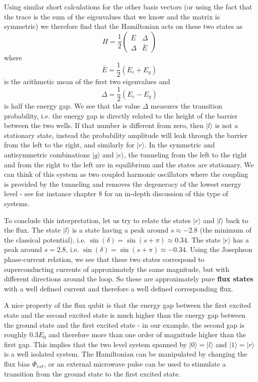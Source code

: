 \documentclass[a4paper, draft]{article}
\theoremstyle{own}
\theoremstyle{remark}
\begin{document}
Using similar short calculations for the other basis vectors (or using the fact that the trace is the sum of the eigenvalues that we know and the matrix is symmetric) we therefore find that the Hamiltonian acts on these two states as
$$
H = \frac{1}{2} 
\begin{pmatrix}
\bar{E} & \Delta \\
\Delta & \bar{E}
\end{pmatrix} 
$$
where
$$
\bar{E} = \frac{1}{2} (E_e + E_g) 
$$
is the arithmetic mean of the first two eigenvalues and 
$$
\Delta = \frac{1}{2} (E_e - E_g)
$$
is half the energy gap. We see that the value $\Delta$ measures the transition probability, i.e. the energy gap is directly related to the height of the barrier between the two wells. If that number is different from zero, then $|l \rangle$ is not a stationary state, instead the probability amplitude will leak through the barrier from the left to the right, and similarly for $|r \rangle$. In the symmetric and antisymmetric combinations $|g \rangle$ and $|e \rangle$, the tunneling from the left to the right and from the right to the left are in equilibrium and the states are stationary. We can think of this system as two coupled harmonic oscillators where the coupling is provided by the tunneling and removes the degeneracy of the lowest energy level - see for instance \cite{FeynmanIII} chapter 8 for an in-depth discussion of this type of systems. 

To conclude this interpretation, let us try to relate the states $|r \rangle$ and $|l \rangle$ back to the flux. The state $|l \rangle$ is a state having a peak around $s \approx -2.8$ (the minimum of the classical potential), i.e. $\sin(\delta) = \sin(s + \pi) \approx 0.34$. The state $|r \rangle$ has a peak around $s = 2.8$, i.e. 
$\sin(\delta) =  \sin(s + \pi) \approx -0.34$. Using the Josephson phase-current relation, we see that these two states correspond to superconducting currents of approximately the same magnitude, but with different directions around the loop. So these are approximately pure {\bf flux states} with a well defined current and therefore a well defined corresponding flux. 

A nice property of the flux qubit is that the energy gap between the first excited state and the second excited state is much higher than the energy gap between the ground state and the first excited state - in our example, the second gap is roughly $0.3 E_0$ and therefore more than one order of magnitude higher than the first gap. This implies that the two level system spanned by $|0 \rangle = |l \rangle$ and $|1 \rangle = |r \rangle$ is a well isolated system. The Hamiltonian can be manipulated by changing the flux bias $\Phi_{ext}$, or an external microwave pulse can be used to stimulate a transition from the ground state to the first excited state. 
\end{document}
